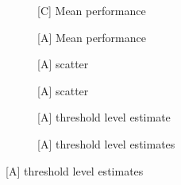 \begin{figure}[tbp]
  \begin{subfigure}[b]{0.49\textwidth}
    \centering
    \caption{\textsf{[C]} Mean performance}
	  \label{fig:chl-imp}
  \end{subfigure}
  \hfill
  \begin{subfigure}[b]{0.49\textwidth}
    \centering
    \caption{\textsf{[A]} Mean performance}
	\label{fig:bgape-imp}
  \end{subfigure}

  \begin{subfigure}[b]{0.49\textwidth}
    \centering
    \vspace{12pt} %
    \caption{\textsf{[A]} \istr scatter}
	  \label{fig:bgape-imp-istr-sc}
  \end{subfigure}
  \hfill
  \begin{subfigure}[b]{0.49\textwidth}
    \centering
    \caption{\textsf{[A]} \iacl scatter}
	\label{fig:bgape-imp-iacl-sc}
  \end{subfigure}

  \begin{subfigure}[b]{0.49\textwidth}
    \centering
    \vspace{12pt} %
    \caption{\textsf{[A]} \istr threshold level estimate}
	  \label{fig:bgape-imp-istr-h}
  \end{subfigure}
  \hfill
  \begin{subfigure}[b]{0.49\textwidth}
    \centering
    \caption{\textsf{[A]} \iacl threshold level estimates}
	\label{fig:bgape-imp-iacl-h}
  \end{subfigure}


\end{figure}
